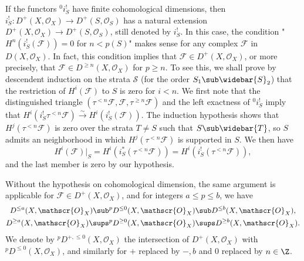 \begin{remark}\label{triangle cat perverse condition finite cohomology dim}
If the functors ${^0i_S^!}$ have finite cohomological dimensions, then $i_S^!:D^+(X,\mathscr{O}_X)\to D^+(S,\mathscr{O}_S)$ has a natural extension $D^+(X,\mathscr{O}_X)\to D^+(S,\mathscr{O}_S)$, still denoted by $i_S^!$. In this case, the condition "$H^n(i_S^!(\mathscr{F}))=0$ for $n<p(S)$" makes sense for any complex $\mathscr{F}$ in $D(X,\mathscr{O}_X)$. In fact, this condition implies that $\mathscr{F}\in D^+(X,\mathscr{O}_X)$, or more precisely, that $\mathscr{F}\in D^{\geq n}(X,\mathscr{O}_X)$ for $p\geq n$. To see this, we shall prove by descendent induction on the strata $\mathcal{S}$ (for the order $S_1\sub\widebar{S}_2$) that the restriction of $H^i(\mathscr{F})$ to $S$ is zero for $i<n$. We first note that the distinguished triangle $(\tau^{<n}\mathscr{F},\mathscr{F},\tau^{\geq n}\mathscr{F})$ and the left exactness of ${^0i_S^!}$ imply that $H^i(i_S^!\tau^{<n}\mathscr{F})\stackrel{\sim}{\to} H^i(i_S^!(\mathscr{F}))$. The induction hypothesis shows that $H^j(\tau^{<n}\mathscr{F})$ is zero over the strata $T\neq S$ such that $S\sub\widebar{T}$, so $S$ admits an neighborhood in which $H^j(\tau^{<n}\mathscr{F})$ is supported in $S$. We then have
\[H^i(\mathscr{F})|_S=H^i(i_S^*(\tau^{<n}\mathscr{F}))=H^i(i_S^!(\tau^{<n}\mathscr{F})),\]
and the last member is zero by our hypothesis.\par
Without the hypothesis on cohomological dimension, the same argument is applicable for $\mathscr{F}\in D^+(X,\mathscr{O}_X)$, and for integers $a\leq p\leq b$, we have
\begin{align}
D^{\leq a}(X,\mathscr{O}_X)\sub &{^pD^{\leq 0}}(X,\mathscr{O}_X)\sub D^{\leq b}(X,\mathscr{O}_X),\label{triangle cat perverse condition inclusion-1}\\
D^{\geq a}(X,\mathscr{O}_X)\sups &{^pD^{\geq 0}}(X,\mathscr{O}_X)\sups D^{\geq b}(X,\mathscr{O}_X).\label{triangle cat perverse condition inclusion-2}
\end{align}
We denote by ${^pD^{+,\leq 0}}(X,\mathscr{O}_X)$ the intersection of $D^+(X,\mathscr{O}_X)$ with ${^pD^{\leq 0}}(X,\mathscr{O}_X)$, and similarly for $+$ replaced by $-,b$ and $0$ replaced by $n\in\Z$.
\end{remark}

